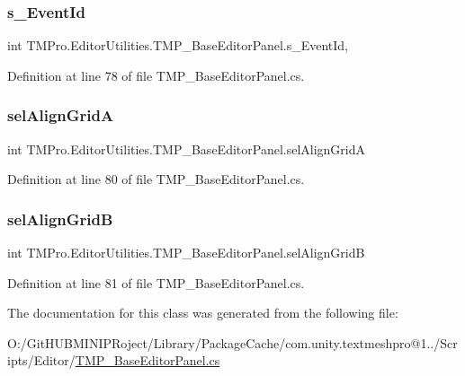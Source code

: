 \subsubsection{\texorpdfstring{s\_EventId}{s\_EventId}}
{\footnotesize\ttfamily int T\+M\+Pro.\+Editor\+Utilities.\+T\+M\+P\+\_\+\+Base\+Editor\+Panel.\+s\+\_\+\+Event\+Id\hspace{0.3cm}{\ttfamily [static]}, {\ttfamily [protected]}}



Definition at line 78 of file T\+M\+P\+\_\+\+Base\+Editor\+Panel.\+cs.

\mbox{\label{class_t_m_pro_1_1_editor_utilities_1_1_t_m_p___base_editor_panel_a7289d43625492e91e63d4508c85fd9e1}} 
\subsubsection{\texorpdfstring{selAlignGridA}{selAlignGridA}}
{\footnotesize\ttfamily int T\+M\+Pro.\+Editor\+Utilities.\+T\+M\+P\+\_\+\+Base\+Editor\+Panel.\+sel\+Align\+GridA}



Definition at line 80 of file T\+M\+P\+\_\+\+Base\+Editor\+Panel.\+cs.

\mbox{\label{class_t_m_pro_1_1_editor_utilities_1_1_t_m_p___base_editor_panel_a4fca9e81bd8b99788677739aba2e17ce}} 
\subsubsection{\texorpdfstring{selAlignGridB}{selAlignGridB}}
{\footnotesize\ttfamily int T\+M\+Pro.\+Editor\+Utilities.\+T\+M\+P\+\_\+\+Base\+Editor\+Panel.\+sel\+Align\+GridB}



Definition at line 81 of file T\+M\+P\+\_\+\+Base\+Editor\+Panel.\+cs.



The documentation for this class was generated from the following file\+:\begin{DoxyCompactItemize}
\item 
O\+:/\+Git\+H\+U\+B\+M\+I\+N\+I\+P\+Roject/\+Library/\+Package\+Cache/com.\+unity.\+textmeshpro@1../\+Scripts/\+Editor/\mbox{\hyperlink{_t_m_p___base_editor_panel_8cs}{T\+M\+P\+\_\+\+Base\+Editor\+Panel.\+cs}}\end{DoxyCompactItemize}
